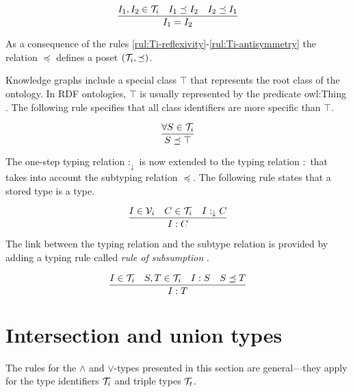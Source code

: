 \documentclass[runningheads]{llncs}
\newcommand{\darr}{\downarrow}
\newcommand{\V}{{\cal V}}
\newcommand{\T}{{\cal T}}
\begin{document}
\begin{equation}
\label{rul:Ti-antisymmetry}
\dfrac{I_1,I_2\in\T_i \quad I_1\preceq\/I_2 \quad I_2\preceq\/I_1}
      {I_1=I_2}   
\end{equation}

As a consequence of the rules
\ref{rul:Ti-reflexivity}-\ref{rul:Ti-antisymmetry} the relation
$\preceq$ defines a poset $(\T_i,\preceq)$.

Knowledge graphs include a special class $\top$ that represents the
root class of the ontology. In RDF ontologies, $\top$ is usually
represented by the predicate owl:Thing \cite{Hoffart2013}. The
following rule specifies that all class identifiers are more specific
than $\top$.

\begin{equation}
\dfrac{\forall\/S\in\T_i}
      {S\preceq\top}
\end{equation}

The one-step typing relation $:_\darr$ is now extended to the typing
relation $:$ that takes into account the subtyping relation $\preceq$.
The following rule states that a stored type is a type.

\begin{equation}
\dfrac{I\in\V_i\quad\/C\in\T_i\quad\/I:_\darr\/C}
      {I:C}
\end{equation}

The link between the typing relation and the subtype relation is
provided by adding a typing rule called \emph{rule of subsumption}
\cite{Pierce2002}.

\begin{equation}
\label{rul:typing-subsumption}
\dfrac{I\in\T_i\quad\/S,T\in\T_i\quad\/I:S\quad\/S\preceq\/T}
      {I:T}    
\end{equation}








\section{Intersection and union types\label{sec:intsc-union}}

The rules for the $\land$ and $\lor$-types presented in this section
are general---they apply for the type identifiers $\T_i$ and triple
types $\T_t$.
\end{document}
